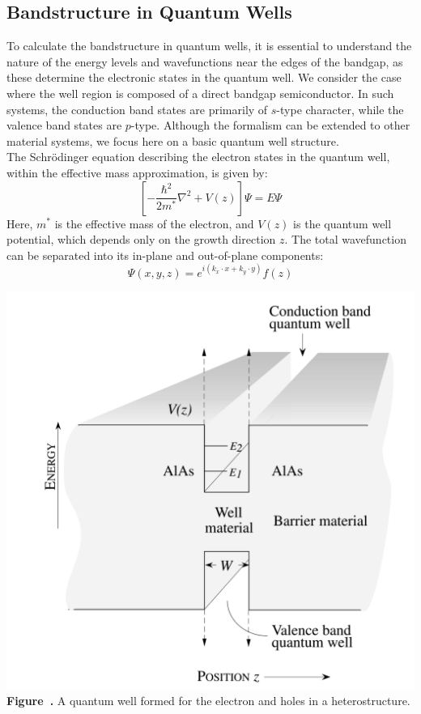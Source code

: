 \subsection{Bandstructure in Quantum Wells}
To calculate the bandstructure in quantum wells, it is essential to understand the nature of the energy levels and wavefunctions near the edges of the bandgap, as these determine the electronic states in the quantum well. We consider the case where the well region is composed of a direct bandgap semiconductor. In such systems, the conduction band states are primarily of $s$-type character, while the valence band states are $p$-type. Although the formalism can be extended to other material systems, we focus here on a basic quantum well structure.\\
The Schrödinger equation describing the electron states in the quantum well, within the effective mass approximation, is given by:
\begin{equation}
	\left[-\frac{\hbar^2}{2 m^*} \nabla^2 + V(z) \right] \Psi = E \Psi
\end{equation}
Here, \( m^* \) is the effective mass of the electron, and \( V(z) \) is the quantum well potential, which depends only on the growth direction \( z \). The total wavefunction can be separated into its in-plane and out-of-plane components:
\begin{equation}
	\Psi(x, y, z) = e^{i(k_x \cdot x + k_y \cdot y)} f(z)
\end{equation}
\begin{center}
	\begin{minipage}{0.6\textwidth}
		\centering
		\includegraphics[width=\textwidth]{img/quantum_well_heterostructure.png}
		\\[0.5em]
		\textbf{Figure~\thefigure.} A quantum well formed for the electron and holes in a heterostructure.
		\label{fig:quantum_well_heterostructure}
	\end{minipage}
\end{center}
